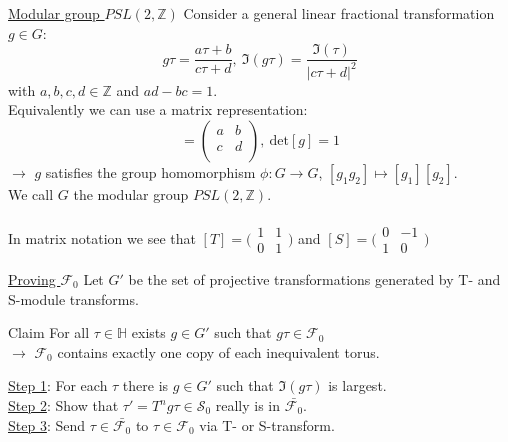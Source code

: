 \documentclass[11pt,aspectratio=169]{beamer}
\begin{document}
\begin{frame}{\underline{Modular group $PSL(2, \mathbb{Z})$}}
	Consider a general linear fractional transformation $g \in G$:
	\begin{equation}
		g\tau = \frac{a\tau + b}{c\tau + d},~\Im(g\tau) = \frac{\Im(\tau)}{|c\tau + d|^2}
	\end{equation}
	with $a, b, c, d \in \mathbb{Z}$ and $ad- bc = 1$.
	\\
	Equivalently we can use a matrix representation:
	\begin{equation}
		[g] = \begin{pmatrix}
			a & b \\
			c & d \\
		\end{pmatrix},~\textrm{det}[g] = 1
	\end{equation}
	$\rightarrow$ $g$ satisfies the group homomorphism $\phi : G \rightarrow G$, $[g_1 g_2] \mapsto [g_1][g_2]$.
	\\
	We call $G$ the modular group $PSL(2, \mathbb{Z})$.
	\\~\\
	In matrix notation we see that $[T] = \big(\begin{smallmatrix}
		1 & 1\\
		0 & 1
	  \end{smallmatrix}\big)$ and $[S] = \big(\begin{smallmatrix}
		0 & -1\\
		1 & 0
	  \end{smallmatrix}\big)$ 
\end{frame}

\begin{frame}{\underline{Proving $\mathcal{F}_0$}}
	Let $G'$ be the set of projective transformations generated by T- and S-module transforms.
	\\
	\begin{block}{Claim}
		For all $\tau \in \mathbb{H}$ exists $g \in G'$ such that $g\tau \in \mathcal{F}_0$
		\\
		$\rightarrow$ $\mathcal{F}_0$ contains exactly one copy of each inequivalent torus.
	\end{block}
	\underline{Step 1}: For each $\tau$ there is $g \in G'$ such that $\Im(g\tau)$ is largest.
	\\
	\underline{Step 2}: Show that $\tau' = T^{n}g\tau \in \mathcal{S}_0$ really is in $\bar{\mathcal{F}_0}$.
	\\
	\underline{Step 3}: Send $\tau \in \bar{\mathcal{F}_0}$ to $\tau \in \mathcal{F}_0$ via T- or S-transform.
\end{frame}
\end{document}
